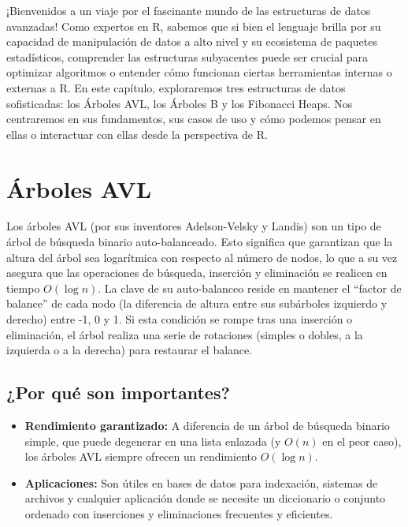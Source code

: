 \documentclass[
  spanish,
  letterpaper,
  DIV=11,
  numbers=noendperiod]{scrreprt}
\providecommand{\tightlist}{%
  \setlength{\itemsep}{0pt}\setlength{\parskip}{0pt}}
\begin{document}
¡Bienvenidos a un viaje por el fascinante mundo de las estructuras de
datos avanzadas! Como expertos en R, sabemos que si bien el lenguaje
brilla por su capacidad de manipulación de datos a alto nivel y su
ecosistema de paquetes estadísticos, comprender las estructuras
subyacentes puede ser crucial para optimizar algoritmos o entender cómo
funcionan ciertas herramientas internas o externas a R. En este
capítulo, exploraremos tres estructuras de datos sofisticadas: los
Árboles AVL, los Árboles B y los Fibonacci Heaps. Nos centraremos en sus
fundamentos, sus casos de uso y cómo podemos pensar en ellas o
interactuar con ellas desde la perspectiva de R.

\section{Árboles AVL}\label{uxe1rboles-avl}

Los árboles AVL (por sus inventores Adelson-Velsky y Landis) son un tipo
de árbol de búsqueda binario auto-balanceado. Esto significa que
garantizan que la altura del árbol sea logarítmica con respecto al
número de nodos, lo que a su vez asegura que las operaciones de
búsqueda, inserción y eliminación se realicen en tiempo \(O(\log n)\).
La clave de su auto-balanceo reside en mantener el ``factor de balance''
de cada nodo (la diferencia de altura entre sus subárboles izquierdo y
derecho) entre -1, 0 y 1. Si esta condición se rompe tras una inserción
o eliminación, el árbol realiza una serie de rotaciones (simples o
dobles, a la izquierda o a la derecha) para restaurar el balance.

\subsection{¿Por qué son importantes?}\label{por-quuxe9-son-importantes}

\begin{itemize}
\tightlist
\item
  \textbf{Rendimiento garantizado:} A diferencia de un árbol de búsqueda
  binario simple, que puede degenerar en una lista enlazada (y \(O(n)\)
  en el peor caso), los árboles AVL siempre ofrecen un rendimiento
  \(O(\log n)\).
\item
  \textbf{Aplicaciones:} Son útiles en bases de datos para indexación,
  sistemas de archivos y cualquier aplicación donde se necesite un
  diccionario o conjunto ordenado con inserciones y eliminaciones
  frecuentes y eficientes.
\end{itemize}
\end{document}
